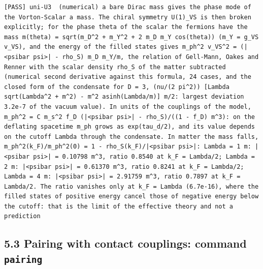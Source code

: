 \documentclass[
  10pt,
]{article}
\begin{document}
\begin{verbatim}
[PASS] uni-U3  (numerical) a bare Dirac mass gives the phase mode of the Vorton-Scalar a mass. The chiral symmetry U(1)_VS is then broken explicitly; for the phase theta of the scalar the fermions have the mass m(theta) = sqrt(m_D^2 + m_Y^2 + 2 m_D m_Y cos(theta)) (m_Y = g_VS v_VS), and the energy of the filled states gives m_ph^2 v_VS^2 = (|<psibar psi>| - rho_S) m_D m_Y/m, the relation of Gell-Mann, Oakes and Renner with the scalar density rho_S of the matter subtracted (numerical second derivative against this formula, 24 cases, and the closed form of the condensate for D = 3, (nu/(2 pi^2)) [Lambda sqrt(Lambda^2 + m^2) - m^2 asinh(Lambda/m)] m/2: largest deviation 3.2e-7 of the vacuum value). In units of the couplings of the model, m_ph^2 = C m_s^2 f_D (|<psibar psi>| - rho_S)/((1 - f_D) m^3): on the deflating spacetime m_ph grows as exp(tau_d/2), and its value depends on the cutoff Lambda through the condensate. In matter the mass falls, m_ph^2(k_F)/m_ph^2(0) = 1 - rho_S(k_F)/|<psibar psi>|: Lambda = 1 m: |<psibar psi>| = 0.10798 m^3, ratio 0.8540 at k_F = Lambda/2; Lambda = 2 m: |<psibar psi>| = 0.61370 m^3, ratio 0.8241 at k_F = Lambda/2; Lambda = 4 m: |<psibar psi>| = 2.91759 m^3, ratio 0.7897 at k_F = Lambda/2. The ratio vanishes only at k_F = Lambda (6.7e-16), where the filled states of positive energy cancel those of negative energy below the cutoff: that is the limit of the effective theory and not a prediction
\end{verbatim}

\hypertarget{pairing-with-contact-couplings-command-pairing}{%
\subsection{\texorpdfstring{5.3 Pairing with contact couplings: command
\texttt{pairing}}{5.3 Pairing with contact couplings: command pairing}}\label{pairing-with-contact-couplings-command-pairing}}
\end{document}
